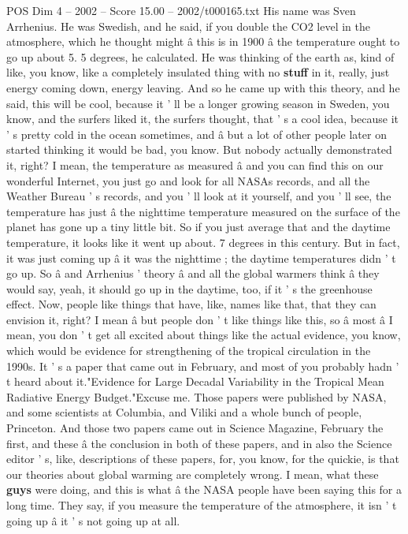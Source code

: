 \begin{textsample}{POS Dim 4 – 2002 – Score 15.00 – 2002/t000165.txt}
His name was Sven Arrhenius.
He was Swedish, and he said, if you double the CO2 level in the atmosphere, which he thought might â this is in 1900 â the temperature ought to go up about 5. 5 degrees, he calculated.
He was thinking of the earth as, kind of like, you know, like a completely insulated thing with no \textbf{stuff} in it, really, just energy coming down, energy leaving.
And so he came up with this theory, and he said, this will be cool, because it ' ll be a longer growing season in Sweden, you know, and the surfers liked it, the surfers thought, that ' s a cool idea, because it ' s pretty cold in the ocean sometimes, and â but a lot of other people later on started thinking it would be bad, you know.
But nobody actually demonstrated it, right?
I mean, the temperature as measured â and you can find this on our wonderful Internet, you just go and look for all NASAs records, and all the Weather Bureau ' s records, and you ' ll look at it yourself, and you ' ll see, the temperature has just â the nighttime temperature measured on the surface of the planet has gone up a tiny little bit.
So if you just average that and the daytime temperature, it looks like it went up about. 7 degrees in this century.
But in fact, it was just coming up â it was the nighttime ; the daytime temperatures didn ' t go up.
So â and Arrhenius ' theory â and all the global warmers think â they would say, yeah, it should go up in the daytime, too, if it ' s the greenhouse effect.
Now, people like things that have, like, names like that, that they can envision it, right?
I mean â but people don ' t like things like this, so â most â I mean, you don ' t get all excited about things like the actual evidence, you know, which would be evidence for strengthening of the tropical circulation in the 1990s.
It ' s a paper that came out in February, and most of you probably hadn ' t heard about it."Evidence for Large Decadal Variability in the Tropical Mean Radiative Energy Budget."Excuse me.
Those papers were published by NASA, and some scientists at Columbia, and Viliki and a whole bunch of people, Princeton.
And those two papers came out in Science Magazine, February the first, and these â the conclusion in both of these papers, and in also the Science editor ' s, like, descriptions of these papers, for, you know, for the quickie, is that our theories about global warming are completely wrong.
I mean, what these \textbf{guys} were doing, and this is what â the NASA people have been saying this for a long time.
They say, if you measure the temperature of the atmosphere, it isn ' t going up â it ' s not going up at all.

\end{textsample}
